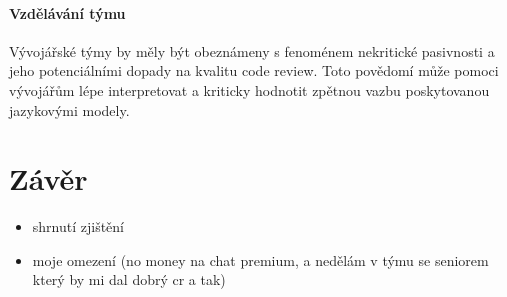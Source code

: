 \documentclass[12pt, a4paper]{article}
\begin{document}
\paragraph{Vzdělávání týmu} Vývojářské týmy by měly být obeznámeny s fenoménem nekritické pasivnosti a jeho potenciálními dopady na kvalitu code review. Toto povědomí může pomoci vývojářům lépe interpretovat a kriticky hodnotit zpětnou vazbu poskytovanou jazykovými modely.


\section{Závěr}
\begin{itemize}
  \item shrnutí zjištění
  \item moje omezení (no money na chat premium, a nedělám v týmu se seniorem který by mi dal dobrý cr a tak)
\end{itemize}



\end{document}
